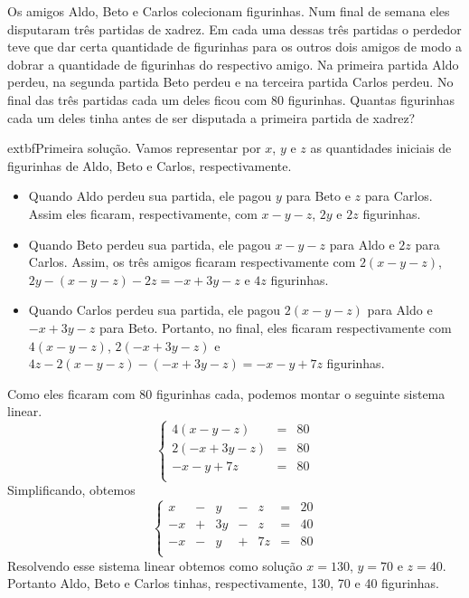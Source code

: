 \begin{problem}
Os amigos Aldo, Beto e Carlos colecionam figurinhas.
Num final de semana eles disputaram três partidas de xadrez.  
Em cada uma dessas três partidas o perdedor teve que dar certa quantidade de figurinhas para os outros dois amigos de modo a dobrar a quantidade de figurinhas do respectivo amigo. 
Na primeira partida Aldo perdeu, na segunda partida Beto perdeu e na terceira partida Carlos perdeu.
No final das três partidas cada um deles ficou com 80 figurinhas.
Quantas figurinhas cada um deles tinha antes de ser disputada a primeira partida de xadrez?
\end{problem}
\begin{solution}
	extbf{Primeira solução.}
Vamos representar por $x$, $y$ e $z$ as quantidades iniciais de figurinhas de Aldo, Beto e Carlos, respectivamente.
\begin{itemize}
\item Quando Aldo perdeu sua partida, ele pagou $y$ para Beto e $z$ para Carlos. Assim eles ficaram, respectivamente, com
$x-y-z$, $2y$ e $2z$ figurinhas.
\item Quando Beto perdeu sua partida, ele pagou $x-y-z$ para Aldo e $2z$ para Carlos. Assim, os três amigos ficaram respectivamente com
$2(x-y-z)$, $2y-(x-y-z)-2z=-x+3y-z$ e $4z$ figurinhas.
\item Quando Carlos perdeu sua partida, ele pagou $2(x-y-z)$ para Aldo e $-x+3y-z$ para Beto. Portanto, no final, eles ficaram respectivamente com $4(x-y-z)$, $2(-x+3y-z)$ e $4z - 2(x-y-z) - (-x+3y-z) = -x-y+7z$ figurinhas.
\end{itemize}
Como eles ficaram com 80 figurinhas cada, podemos montar o seguinte sistema linear.
$$\left\{\begin{array}{rrrrrrr}
4(x-y-z)    & = & 80  \\
2(-x+3y-z)  & = & 80 \\
-x-y+7z     & = & 80 \\ \end{array}\right.$$Simplificando, obtemos
$$\left\{\begin{array}{rrrrrrr}
   x & - &   y  & - &    z & = &   20  \\
  -x & + &  3y  & - &    z & = &   40  \\
	-x & - &   y  & + &   7z & = &   80  \\
\end{array} \right.$$Resolvendo esse sistema linear obtemos como solução $x=130$, $y=70$ e $z=40$. Portanto Aldo, Beto e Carlos tinhas, respectivamente, 130, 70 e 40 figurinhas.

\end{solution}
